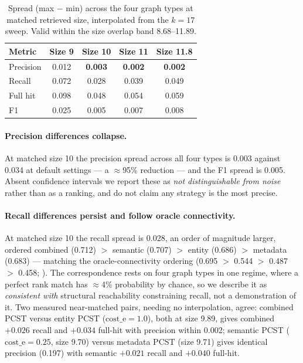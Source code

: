 \documentclass[11pt]{article}
\begin{document}
\begin{table}[t]
  \centering
  \small
  \begin{tabular}{lcccc}
    \toprule
    \textbf{Metric} & \textbf{Size 9} & \textbf{Size 10} & \textbf{Size 11} & \textbf{Size 11.8} \\
    \midrule
    Precision & 0.012 & \textbf{0.003} & \textbf{0.002} & \textbf{0.002} \\
    Recall    & 0.072 & 0.028          & 0.039          & 0.049          \\
    Full hit  & 0.098 & 0.048          & 0.054          & 0.059          \\
    F1        & 0.025 & 0.005          & 0.007          & 0.008          \\
    \bottomrule
  \end{tabular}
  \caption{Spread (max $-$ min) across the four graph types at matched retrieved size, interpolated from the $k{=}17$ sweep. Valid within the size overlap band 8.68--11.89.}
  \label{tab:size-control}
\end{table}

\paragraph{Precision differences collapse.} At matched size 10 the precision spread across all four types is 0.003 against 0.034 at default settings --- a $\approx$95\% reduction --- and the F1 spread is 0.005. Absent confidence intervals we report these as \textit{not distinguishable from noise} rather than as a ranking, and do not claim any strategy is the most precise.

\paragraph{Recall differences persist and follow oracle connectivity.} At matched size 10 the recall spread is 0.028, an order of magnitude larger, ordered combined (0.712) $>$ semantic (0.707) $>$ entity (0.686) $>$ metadata (0.683) --- matching the oracle-connectivity ordering (0.695 $>$ 0.544 $>$ 0.487 $>$ 0.458; ). The correspondence rests on four graph types in one regime, where a perfect rank match has $\approx$4\% probability by chance, so we describe it as \textit{consistent with} structural reachability constraining recall, not a demonstration of it. Two measured near-matched pairs, needing no interpolation, agree: combined PCST versus entity PCST ($\mathrm{cost\_e}{=}1.0$), both at size 9.89, gives combined $+0.026$ recall and $+0.034$ full-hit with precision within 0.002; semantic PCST ($\mathrm{cost\_e}{=}0.25$, size 9.70) versus metadata PCST (size 9.71) gives identical precision (0.197) with semantic $+0.021$ recall and $+0.040$ full-hit.
\end{document}
